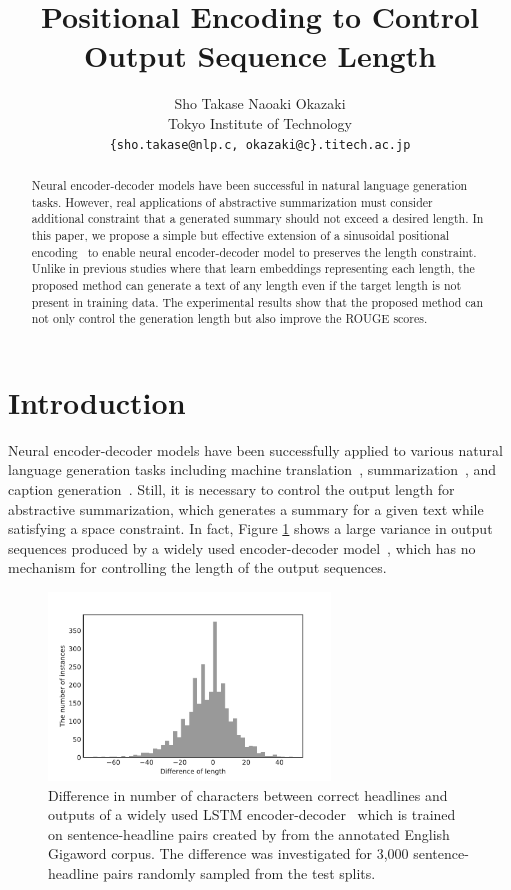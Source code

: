 \documentclass[11pt,a4paper]{article}
\title{Positional Encoding to Control Output Sequence Length}
\author{Sho Takase \hspace{1.5em} Naoaki Okazaki \\
  Tokyo Institute of Technology \\
  {\tt \{sho.takase@nlp.c, okazaki@c\}.titech.ac.jp} \\
  }
\date{}
\begin{document}
\maketitle
\begin{abstract}
Neural encoder-decoder models have been successful in natural language generation tasks.
However, real applications of abstractive summarization must consider additional constraint that a generated summary should not exceed a desired length.
In this paper, we propose a simple but effective extension of a sinusoidal positional encoding~\cite{NIPS2017_7181} to enable neural encoder-decoder model to preserves the length constraint.
Unlike in previous studies where that learn embeddings representing each length, the proposed method can generate a text of any length even if the target length is not present in training data.
The experimental results show that the proposed method can not only control the generation length but also improve the ROUGE scores.
\end{abstract}

\section{Introduction}
Neural encoder-decoder models have been successfully applied to various natural language generation tasks including machine translation~\cite{Sutskever:2014:SSL:2969033.2969173}, summarization~\cite{rush-chopra-weston:2015:EMNLP}, and caption generation~\cite{journals/corr/VinyalsTBE14}.
Still, it is necessary to control the output length for abstractive summarization, which generates a summary for a given text while satisfying a space constraint.
In fact, Figure \ref{fig:length_dist} shows a large variance in output sequences produced by a widely used encoder-decoder model~\cite{luong-pham-manning:2015:EMNLP}, which has no mechanism for controlling the length of the output sequences.


\begin{figure}[!t]
  \centering
  \includegraphics[width=7.5cm]{./length_dist_cutted.pdf}
   \caption{Difference in number of characters between correct headlines and outputs of a widely used LSTM encoder-decoder~\cite{luong-pham-manning:2015:EMNLP} which is trained on sentence-headline pairs created by  from the annotated English Gigaword corpus. The difference was investigated for 3,000 sentence-headline pairs randomly sampled from the test splits.}
   \label{fig:length_dist}
\end{figure}
\end{document}
